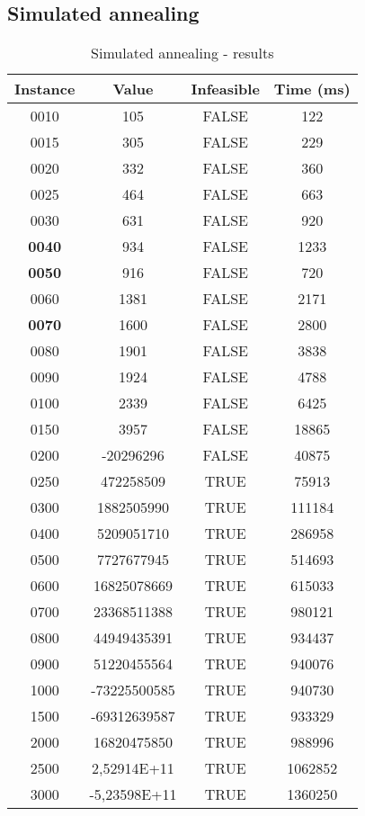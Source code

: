  \subsection*{Simulated annealing}
\begin{table}[H]
	\begin{tabular}{||c | c | c | c||} 
		\hline
		Instance  & Value & Infeasible & Time (ms) \\
		\hline\hline
		0010	& 	105	& 	FALSE	& 	122	\\
		0015	& 	305	& 	FALSE	& 	229	\\
		0020	& 	332	& 	FALSE	& 	360	\\
		0025	& 	464	& 	FALSE	& 	663	\\
		0030	& 	631	& 	FALSE	& 	920	\\
		\textbf{0040}	& 	934	& 	FALSE	& 	1233	\\
		\textbf{0050}	& 	916	& 	FALSE	& 	720	\\
		0060	& 	1381	& 	FALSE	& 	2171	\\
		\textbf{	0070}	& 	1600	& 	FALSE	& 	2800	\\
		0080	& 	1901	& 	FALSE	& 	3838	\\
		0090	& 	1924	& 	FALSE	& 	4788	\\
		0100	& 	2339	& 	FALSE	& 	6425	\\
		0150	& 	3957	& 	FALSE	& 	18865	\\
		0200	& 	-20296296	& 	FALSE	& 	40875	\\
		0250	& 	472258509	& 	TRUE	& 	75913	\\
		0300	& 	1882505990	& 	TRUE	& 	111184	\\
		0400	& 	5209051710	& 	TRUE	& 	286958	\\
		0500	& 	7727677945	& 	TRUE	& 	514693	\\
		0600	& 	16825078669	& 	TRUE	& 	615033	\\
		0700	& 	23368511388	& 	TRUE	& 	980121	\\
		0800	& 	44949435391	& 	TRUE	& 	934437	\\
		0900	& 	51220455564	& 	TRUE	& 	940076	\\
		1000	& 	-73225500585	& 	TRUE	& 	940730	\\
		1500	& 	-69312639587	& 	TRUE	& 	933329	\\
		2000	& 	16820475850	& 	TRUE	& 	988996	\\
		2500	& 	2,52914E+11	& 	TRUE	& 	1062852	\\
		3000	& 	-5,23598E+11	& 	TRUE	& 	1360250	\\
		
		\hline
	\end{tabular}
	\caption{Simulated annealing - results}
\end{table}